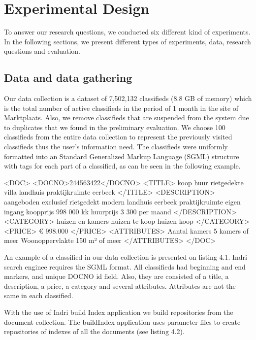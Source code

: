 \chapter{Experimental Design}
To answer our research questions, we conducted six different kind of experiments. In the following sections, we present different types of experiments, data, research questions and evaluation.



\section{Data and data gathering}

Our data collection is a dataset of 7,502,132 classifieds (8.8 GB of memory) which is the total number of active classifieds in the period of 1 month in the site of Marktplaats. Also, we remove classifieds that are suspended from the system due to duplicates that we found in the preliminary evaluation. We choose 100 classifieds from the entire data collection to represent the previously visited classifieds thus the user's information need. The classifieds were uniformly formatted into an Standard Generalized Markup Language (SGML) structure with tags for each part of a classified, as can be seen in the following example.



{\small
\begin{code}[caption={SGML formated classified}]
<DOC>
	<DOCNO>244563422</DOCNO>
	 <TITLE>
		 koop huur rietgedekte villa landhuis praktijkruimte eerbeek
	</TITLE>
	<DESCRIPTION>
		 aangeboden exclusief rietgedekt modern landhuis eerbeek praktijkruimte eigen ingang koopprijs   998 000   kk   huurprijs   3 300   per maand
	</DESCRIPTION>
	<CATEGORY>
		 huizen en kamers huizen te koop  huizen koop
	</CATEGORY>
	<PRICE>
		€ 998.000
	</PRICE>
	<ATTRIBUTES>
	  Aantal kamers 5 kamers of meer Woonoppervlakte 150 m² of meer
	</ATTRIBUTES>
</DOC>
\end{code}
}


An example of a classified in our data collection is presented on listing 4.1. Indri search enginee requires the SGML format. All classifieds had beginning and end markers, and unique DOCNO id field. Also, they are consisted of a title, a description, a price, a category and several attributes. Attributes are not the same in each classified.

With the use of Indri build Index application we build repositories from the document collection. The buildIndex application uses parameter files to create repositories of indexes of all the documents (see listing 4.2).

